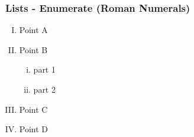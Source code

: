 \label{enumerateRomanNumerals}
\begin{frame}\frametitle{Lists - Enumerate (Roman Numerals)}
  \begin{enumerate} [(I)]
	\item Point A
	\item Point B
	\begin{enumerate} [(i)]
	  \item part 1
      \item part 2
	\end{enumerate}
	\item Point C
	\item Point D
  \end{enumerate}
\end{frame}